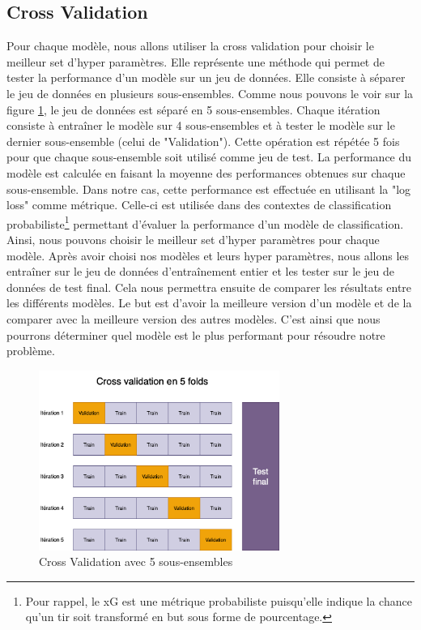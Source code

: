 \documentclass[12pt]{article}
\begin{document}
\subsection{Cross Validation}
\label{sec:cross_validation}
Pour chaque modèle, nous allons utiliser la cross validation pour choisir le meilleur set d'hyper paramètres.
Elle représente une méthode qui permet de tester la performance d'un modèle sur un jeu de données.
Elle consiste à séparer le jeu de données en plusieurs sous-ensembles.
Comme nous pouvons le voir sur la figure \ref{fig:cross_validation}, le jeu de données est séparé en 5 sous-ensembles.
Chaque itération consiste à entraîner le modèle sur 4 sous-ensembles et à tester le modèle sur le dernier sous-ensemble (celui de "Validation").
Cette opération est répétée 5 fois pour que chaque sous-ensemble soit utilisé comme jeu de test.
La performance du modèle est calculée en faisant la moyenne des performances obtenues sur chaque sous-ensemble.
Dans notre cas, cette performance est effectuée en utilisant la "log loss" comme métrique.
Celle-ci est utilisée dans des contextes de classification probabiliste\footnote{Pour rappel, le xG est une métrique probabiliste puisqu'elle indique la chance qu'un tir soit transformé en but sous forme de pourcentage.} permettant d'évaluer la performance d'un modèle de classification.
Ainsi, nous pouvons choisir le meilleur set d'hyper paramètres pour chaque modèle.
\newline\newline
Après avoir choisi nos modèles et leurs hyper paramètres, nous allons les entraîner sur le jeu de données d'entraînement entier et les tester sur le jeu de données de test final.
Cela nous permettra ensuite de comparer les résultats entre les différents modèles.
Le but est d'avoir la meilleure version d'un modèle et de la comparer avec la meilleure version des autres modèles. 
C'est ainsi que nous pourrons déterminer quel modèle est le plus performant pour résoudre notre problème.
\begin{figure}[htp]
    \centering
    \includegraphics[width=0.7\textwidth]{img/cross_validation_schema.png}
    \caption{Cross Validation avec 5 sous-ensembles}
    \label{fig:cross_validation}
\end{figure}
\newpage
\end{document}

